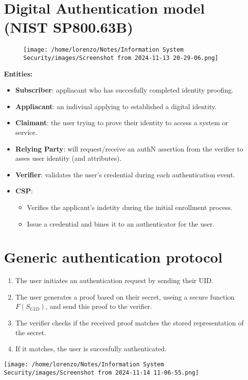 \section{Digital Authentication model (NIST SP800.63B)}
\begin{figure}[h]
    \centering
    \texttt{[image: /home/lorenzo/Notes/Information System Security/images/Screenshot from 2024-11-13 20-29-06.png]}
\end{figure}
\textbf{Entities:}
\begin{itemize}
    \item \textbf{Subscriber}: appliacant who has succesfully completed identity proofing.
    \item \textbf{Appliacant}: an indiviual applying to established a digital identity.
    \item \textbf{Claimant}: the user trying to prove their identity to access a system or service.
    \item \textbf{Relying Party}: will request/receive an authN assertion from the verifier to asses user identity (and attributes).
    \item \textbf{Verifier}: validates the user's credential during each authentication event. 
    \item \textbf{CSP}: 
        \begin{itemize}
            \item Verifies the applicant's indetity during the initial enrollment process. 
            \item Issue a credential and bines it to an authenticator for the user.
        \end{itemize} 
\end{itemize}


\section{Generic authentication protocol}
\begin{minipage}{0.5\textwidth}
    \begin{enumerate}
        \item The user initiates an authentication request by sending their UID.
        \item The user generates a proof based on their secret, useing a secure function \(F(S_{UID})\), and send this proof to the verifier.
        \item The verifier checks if the received proof matches the stored representation of the secret.
        \item If it matches, the user is succesfully authenticated.
    \end{enumerate}
\end{minipage} 
\hspace{1cm}
\begin{minipage}{0.5\textwidth}
    \centering
    \texttt{[image: /home/lorenzo/Notes/Information System Security/images/Screenshot from 2024-11-14 11-06-55.png]}
\end{minipage}




